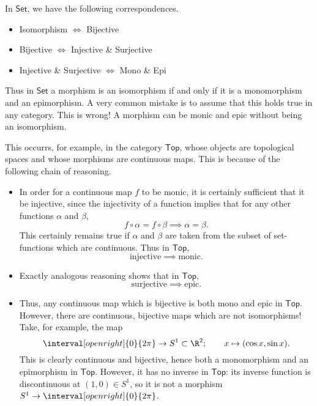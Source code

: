 \documentclass[notes.tex]{subfiles}
\begin{document}
\begin{note}
  In $\mathsf{Set}$, we have the following correspondences.
  \begin{itemize}
    \item Isomorphism $\iff$ Bijective
    \item Bijective $\iff$ Injective \& Surjective
    \item Injective \& Surjective $\iff$ Mono \& Epi
  \end{itemize}
  Thus in $\mathsf{Set}$ a morphism is an isomorphism if and only if it is a monomorphism and an epimorphism. A very common mistake is to assume that this holds true in any category. This is wrong! A morphism can be monic and epic without being an isomorphism.

  This occurrs, for example, in the category $\mathsf{Top}$, whose objects are topological spaces and whose morphisms are continuous maps. This is because of the following chain of reasoning.

  \begin{itemize}
    \item In order for a continuous map $f$ to be monic, it is certainly sufficient that it be injective, since the injectivity of a function implies that for any other functions $\alpha$ and $\beta$,
      \begin{equation*}
        f \circ \alpha = f \circ \beta \implies \alpha = \beta.
      \end{equation*}
      This certainly remains true if $\alpha$ and $\beta$ are taken from the subset of set-functions which are continuous. Thus in $\mathsf{Top}$,
      \begin{equation*}
        \text{injective} \implies \text{monic}.
      \end{equation*}

    \item Exactly analogous reasoning shows that in $\mathsf{Top}$,
      \begin{equation*}
        \text{surjective} \implies \text{epic}.
      \end{equation*}

    \item Thus, any continuous map which is bijective is both mono and epic in $\mathsf{Top}$. However, there are continuous, bijective maps which are not isomorphisms! Take, for example, the map
      \begin{equation*}
        \interval[open right]{0}{2 \pi} \to S^{1} \subset \R^{2};\qquad x \mapsto (\cos x, \sin x).
      \end{equation*}
      This is clearly continuous and bijective, hence both a monomorphism and an epimorphism in $\mathsf{Top}$. However, it has no inverse in $\mathsf{Top}$: its inverse function is discontinuous at $(1, 0) \in S^{1}$, so it is not a morphism $S^{1} \to \interval[open right]{0}{2 \pi}$.
  \end{itemize}
\end{note}
\end{document}

